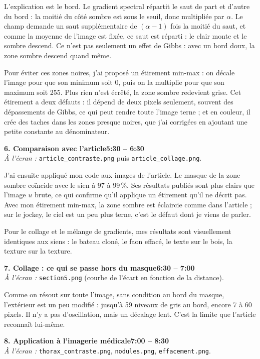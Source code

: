 \documentclass[11pt,a4paper]{article}
\newcommand{\partie}[3]{\bigskip\noindent\colorbox{gray!15}{\parbox{\dimexpr\linewidth-2\fboxsep}{%
  \textbf{#1}\hfill\textbf{#2}\\ \small\textit{À l'écran :} #3}}\par}
\begin{document}
L'explication est le bord. Le gradient spectral répartit le saut de part et d'autre du bord : la moitié
du côté sombre est sous le seuil, donc multipliée par $\alpha$. Le champ demande un saut supplémentaire
de $(\alpha - 1)$ fois la moitié du saut, et comme la moyenne de l'image est fixée, ce saut est réparti :
le clair monte et le sombre descend. Ce n'est pas seulement un effet de Gibbs : avec un bord doux, la
zone sombre descend quand même.

Pour éviter ces zones noires, j'ai proposé un étirement min-max : on décale l'image pour que son minimum
soit 0, puis on la multiplie pour que son maximum soit 255. Plus rien n'est écrêté, la zone sombre
redevient grise. Cet étirement a deux défauts : il dépend de deux pixels seulement, souvent des
dépassements de Gibbs, ce qui peut rendre toute l'image terne ; et en couleur, il crée des taches dans
les zones presque noires, que j'ai corrigées en ajoutant une petite constante au dénominateur.

\partie{6. Comparaison avec l'article}{5:30 -- 6:30}{\texttt{article\_contraste.png} puis
\texttt{article\_collage.png}.}

J'ai ensuite appliqué mon code aux images de l'article. Le masque de la zone sombre coïncide avec le sien
à 97 à 99\,\%. Ses résultats publiés sont plus clairs que l'image $u$ brute, ce qui confirme qu'il
applique un étirement qu'il ne décrit pas. Avec mon étirement min-max, la zone sombre est éclaircie comme
dans l'article ; sur le jockey, le ciel est un peu plus terne, c'est le défaut dont je viens de parler.

Pour le collage et le mélange de gradients, mes résultats sont visuellement identiques aux siens : le
bateau cloné, le faon effacé, le texte sur le bois, la texture sur la texture.

\partie{7. Collage : ce qui se passe hors du masque}{6:30 -- 7:00}{\texttt{section5.png} (courbe de
l'écart en fonction de la distance).}

Comme on résout sur toute l'image, sans condition au bord du masque, l'extérieur est un peu modifié :
jusqu'à 59 niveaux de gris au bord, encore 7 à 60 pixels. Il n'y a pas d'oscillation, mais un décalage
lent. C'est la limite que l'article reconnaît lui-même.

\partie{8. Application à l'imagerie médicale}{7:00 -- 8:30}{\texttt{thorax\_contraste.png},
\texttt{nodules.png}, \texttt{effacement.png}.}
\end{document}
